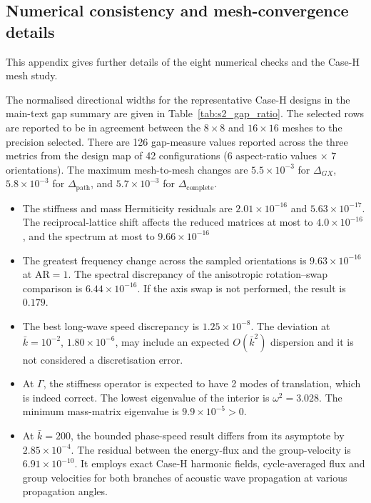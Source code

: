 \subsection{Numerical consistency and mesh-convergence details}
\label{app:numerical_checks}
This appendix gives further details of the eight numerical checks and the Case-H mesh study.


The normalised directional widths for the representative Case-H designs in the main-text gap summary are given in Table~\ref{tab:s2_gap_ratio}. The selected rows are reported to be in agreement between the $8\times8$ and $16\times16$ meshes to the precision selected. There are 126 gap-measure values reported across the three metrics from the design map of 42 configurations ($6$ aspect-ratio values $\times$ $7$ orientations). The maximum mesh-to-mesh changes are $5.5\times10^{-3}$ for $\Delta_{GX}$, $5.8\times10^{-3}$ for $\Delta_{\mathrm{path}}$, and $5.7\times10^{-3}$ for $\Delta_{\mathrm{complete}}$.
\begin{table}[htbp]
\centering
\caption{Normalised directional-gap widths for the representative Case-H designs.}
\label{tab:s2_gap_ratio}

\end{table}

\begin{itemize}
  \item The stiffness and mass Hermiticity residuals are $2.01\times10^{-16}$ and $5.63\times10^{-17}$. The reciprocal-lattice shift affects the reduced matrices at most to $4.0\times10^{-16}$, and the spectrum at most to $9.66\times10^{-16}$
  \item The greatest frequency change across the sampled orientations is $9.63\times10^{-16}$ at $\mathrm{AR}=1$. The spectral discrepancy of the anisotropic rotation--swap comparison is $6.44\times10^{-16}$. If the axis swap is not performed, the result is $0.179$.
  \item The best long-wave speed discrepancy is $1.25\times10^{-8}$. The deviation at $\bar{k}=10^{-2}$, $1.80\times10^{-6}$, may include an expected $O(\bar{k}^2)$ dispersion and it is not considered a discretisation error.
  \item At $\Gamma$, the stiffness operator is expected to have 2 modes of translation, which is indeed correct. The lowest eigenvalue of the interior is $\omega^2=3.028$. The minimum mass-matrix eigenvalue is $9.9\times10^{-5}>0$.
  \item At $\bar{k}=200$, the bounded phase-speed result differs from its asymptote by $2.85\times10^{-4}$. The residual between the energy-flux and the group-velocity is $6.91\times10^{-10}$. It employs exact Case-H harmonic fields, cycle-averaged flux and group velocities for both branches of acoustic wave propagation at various propagation angles.
\end{itemize}

